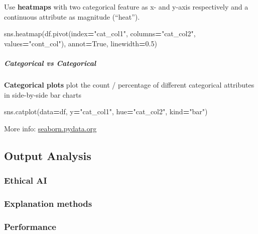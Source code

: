 \documentclass[
]{book}
\newenvironment{Shaded}{\begin{snugshade}}{\end{snugshade}}
\newcommand{\FloatTok}[1]{\textcolor[rgb]{0.00,0.00,0.81}{#1}}
\newcommand{\NormalTok}[1]{#1}
\newcommand{\OperatorTok}[1]{\textcolor[rgb]{0.81,0.36,0.00}{\textbf{#1}}}
\newcommand{\StringTok}[1]{\textcolor[rgb]{0.31,0.60,0.02}{#1}}
\newcommand{\VariableTok}[1]{\textcolor[rgb]{0.00,0.00,0.00}{#1}}
\begin{document}
Use \textbf{heatmaps} with two categorical feature as x- and y-axis
respectively and a continuous attribute as magnitude (``heat'').

\begin{Shaded}
\begin{Highlighting}[]
\NormalTok{sns.heatmap(df.pivot(index}\OperatorTok{=}\StringTok{"cat\_col1"}\NormalTok{, columns}\OperatorTok{=}\StringTok{"cat\_col2"}\NormalTok{, values}\OperatorTok{=}\StringTok{"cont\_col"}\NormalTok{), annot}\OperatorTok{=}\VariableTok{True}\NormalTok{, linewidth}\OperatorTok{=}\FloatTok{0.5}\NormalTok{)}
\end{Highlighting}
\end{Shaded}

\hypertarget{categorical-vs-categorical}{%
\subparagraph{Categorical vs Categorical}\label{categorical-vs-categorical}}

\textbf{Categorical plots} plot the count / percentage of different
categorical attributes in side-by-side bar charts

\begin{Shaded}
\begin{Highlighting}[]
\NormalTok{sns.catplot(data}\OperatorTok{=}\NormalTok{df, y}\OperatorTok{=}\StringTok{"cat\_col1"}\NormalTok{, hue}\OperatorTok{=}\StringTok{"cat\_col2"}\NormalTok{, kind}\OperatorTok{=}\StringTok{"bar"}\NormalTok{)}
\end{Highlighting}
\end{Shaded}

More info:
\href{https://seaborn.pydata.org/tutorial/categorical.html}{seaborn.pydata.org}

\hypertarget{output-analysis}{%
\subsection{Output Analysis}\label{output-analysis}}

\hypertarget{ethical-ai}{%
\subsubsection{Ethical AI}\label{ethical-ai}}

\hypertarget{explanation-methods}{%
\subsubsection{Explanation methods}\label{explanation-methods}}

\hypertarget{performance}{%
\subsubsection{Performance}\label{performance}}
\end{document}
